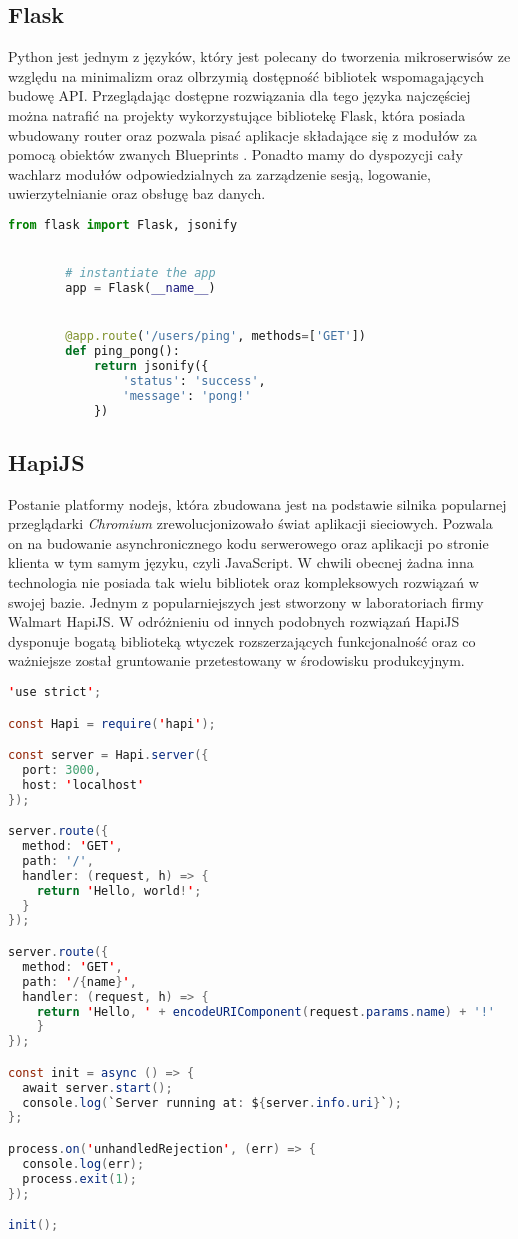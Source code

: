\subsection{Flask}
Python jest jednym z języków, który jest polecany do tworzenia mikroserwisów ze względu na minimalizm oraz olbrzymią dostępność  bibliotek wspomagających budowę API\@. Przeglądając dostępne rozwiązania dla tego języka najczęściej można natrafić na projekty wykorzystujące bibliotekę Flask, która posiada wbudowany router oraz pozwala pisać aplikacje składające się z modułów za pomocą obiektów zwanych Blueprints \cite{grinberg2018flask}. Ponadto mamy do dyspozycji cały wachlarz modułów odpowiedzialnych za zarządzenie sesją, logowanie, uwierzytelnianie oraz obsługę baz danych.
\begin{lstlisting}[language=Python, caption=Prosty model aplikacji z użyciem Flask]       
        from flask import Flask, jsonify


        # instantiate the app
        app = Flask(__name__)


        @app.route('/users/ping', methods=['GET'])
        def ping_pong():
            return jsonify({
                'status': 'success',
                'message': 'pong!'
            })
\end{lstlisting}
\subsection{HapiJS}
Postanie platformy nodejs, która zbudowana jest na podstawie silnika popularnej przeglądarki \textit{Chromium} zrewolucjonizowało świat aplikacji sieciowych. Pozwala on na budowanie asynchronicznego kodu serwerowego oraz aplikacji po stronie klienta w tym samym języku, czyli JavaScript. W chwili obecnej żadna inna technologia nie posiada tak wielu bibliotek oraz kompleksowych rozwiązań w swojej bazie. Jednym z popularniejszych jest stworzony w laboratoriach firmy Walmart HapiJS\@. W odróżnieniu od innych podobnych rozwiązań HapiJS dysponuje bogatą biblioteką wtyczek rozszerzających funkcjonalność\cite{brett2016getting} oraz co ważniejsze został gruntowanie przetestowany w środowisku produkcyjnym.
\begin{center}
  \begin{lstlisting}[language=java, caption=Przykład uruchomienia serwera http w HapiJS]
'use strict';

const Hapi = require('hapi');

const server = Hapi.server({
  port: 3000,
  host: 'localhost'
});

server.route({
  method: 'GET',
  path: '/',
  handler: (request, h) => {
    return 'Hello, world!';
  }
});

server.route({
  method: 'GET',
  path: '/{name}',
  handler: (request, h) => {
    return 'Hello, ' + encodeURIComponent(request.params.name) + '!'
    }
});

const init = async () => {
  await server.start();
  console.log(`Server running at: ${server.info.uri}`);
};

process.on('unhandledRejection', (err) => {
  console.log(err);
  process.exit(1);
});

init();
    \end{lstlisting}
\end{center}
